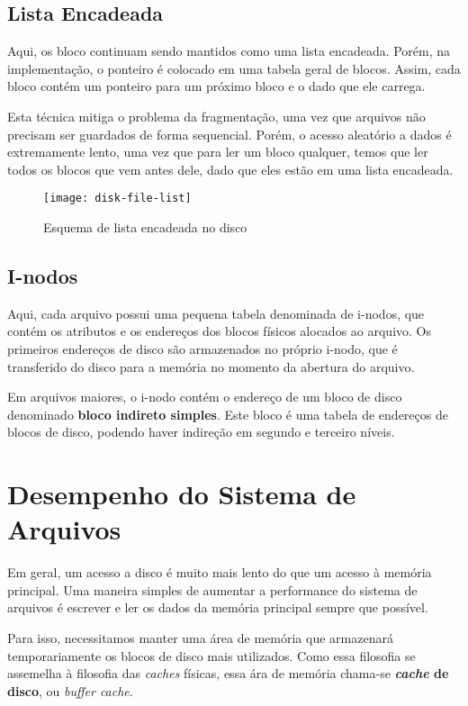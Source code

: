 \subsection{Lista Encadeada}
Aqui, os bloco continuam sendo mantidos como uma lista encadeada. Porém, na implementação, o ponteiro é colocado em uma tabela geral de blocos. Assim, cada bloco contém um ponteiro para um próximo bloco e o dado que ele carrega.

Esta técnica mitiga o problema da fragmentação, uma vez que arquivos não precisam ser guardados de forma sequencial. Porém, o acesso aleatório a dados é extremamente lento, uma vez que para ler um bloco qualquer, temos que ler todos os blocos que vem antes dele, dado que eles estão em uma lista encadeada.

\begin{figure}[h]
  \centering
  \texttt{[image: disk-file-list]}
  \caption{Esquema de lista encadeada no disco}
  \label{fig:disk-file-list}
\end{figure}

\subsection{I-nodos}
Aqui, cada arquivo possui uma pequena tabela denominada de i-nodos, que contém os atributos e os endereços dos blocos físicos alocados ao arquivo. Os primeiros endereços de disco são armazenados no próprio i-nodo, que é transferido do disco para a memória no momento da abertura do arquivo.

Em arquivos maiores, o i-nodo contém o endereço de um bloco de disco denominado \textbf{bloco indireto simples}. Este bloco é uma tabela de endereços de blocos de disco, podendo haver indireção em segundo e terceiro níveis.

\section{Desempenho do Sistema de Arquivos}
Em geral, um acesso a disco é muito mais lento do que um acesso à memória principal. Uma maneira simples de aumentar a performance do sistema de arquivos é escrever e ler os dados da memória principal sempre que possível.

Para isso, necessitamos manter uma área de memória que armazenará temporariamente os blocos de disco mais utilizados. Como essa filosofia se assemelha à filosofia das \textit{caches} físicas, essa ára de memória chama-se \textbf{\textit{cache} de disco}, ou \textit{buffer cache}.

